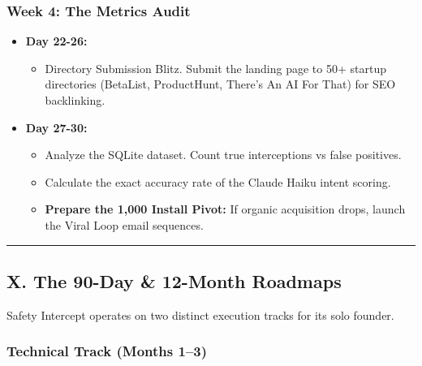 \documentclass[
]{article}
\providecommand{\tightlist}{%
  \setlength{\itemsep}{0pt}\setlength{\parskip}{0pt}}
\begin{document}
\subsubsection{Week 4: The Metrics
Audit}\label{week-4-the-metrics-audit}

\begin{itemize}
\tightlist
\item
  \textbf{Day 22-26:}

  \begin{itemize}
  \tightlist
  \item
    Directory Submission Blitz. Submit the landing page to 50+ startup
    directories (BetaList, ProductHunt, There's An AI For That) for SEO
    backlinking.
  \end{itemize}
\item
  \textbf{Day 27-30:}

  \begin{itemize}
  \tightlist
  \item
    Analyze the SQLite dataset. Count true interceptions vs false
    positives.
  \item
    Calculate the exact accuracy rate of the Claude Haiku intent
    scoring.
  \item
    \textbf{Prepare the 1,000 Install Pivot:} If organic acquisition
    drops, launch the Viral Loop email sequences.
  \end{itemize}
\end{itemize}

\begin{center}\rule{0.5\linewidth}{0.5pt}\end{center}

\subsection{X. The 90-Day \& 12-Month
Roadmaps}\label{x.-the-90-day-12-month-roadmaps}

Safety Intercept operates on two distinct execution tracks for its solo
founder.

\subsubsection{Technical Track (Months
1--3)}\label{technical-track-months-13}
\end{document}
